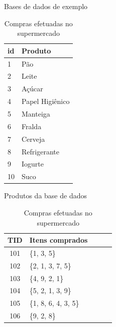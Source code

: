 \begin{table}[!htb]
 \caption{Bases de dados de exemplo}
   \begin{subtable}{.5\linewidth}
    	\centering
   		\begin{tabular}{|l|l|} \hline 
   			\textbf{id} & \textbf{Produto} 		\\ \hline 
	   		 1	& Pão                 			\\ \hline 
	   		 2	& Leite            				\\ \hline 
	   		 3  & Açúcar             			\\ \hline
	   		 4  & Papel Higiênico    			\\ \hline
	   		 5  & Manteiga           			\\ \hline
	   		 6  & Fralda             			\\ \hline
	   		 7  & Cerveja            			\\ \hline
	   		 8  & Refrigerante      			\\ \hline
	   		 9  & Iogurte            			\\ \hline
	   		 10 & Suco	         				\\ \hline
   		\end{tabular}
   		\vspace{0.1cm}
   		\caption{Produtos da base de dados}   
   		\label{TABAPRIORI:PRODUTOSMERCADO}		
   \end{subtable}%
   \begin{subtable}{.5\linewidth}
   		\centering
   		\begin{tabular}{|c|l|l|l|l|} \hline 
   		\textbf{TID} & \textbf{Itens comprados}		\\ \hline 
   		101                & \{1, 3, 5\}			\\ \hline 
   		102                & \{2, 1, 3, 7, 5\}	 	\\ \hline
   		103                & \{4, 9, 2, 1\}    		\\ \hline
   		104                & \{5, 2, 1, 3, 9\}   	\\ \hline
   		105                & \{1, 8, 6, 4, 3, 5\}	\\ \hline
   		106                & \{9, 2, 8\}  			\\ \hline
   		\end{tabular}
   		 \caption{Compras efetuadas no supermercado}
   		 \label{TABAPRIORI:ITEMSETS}
   \end{subtable}
\label{TABAPRIORI}
\vspace{0.1cm}
\end{table}

